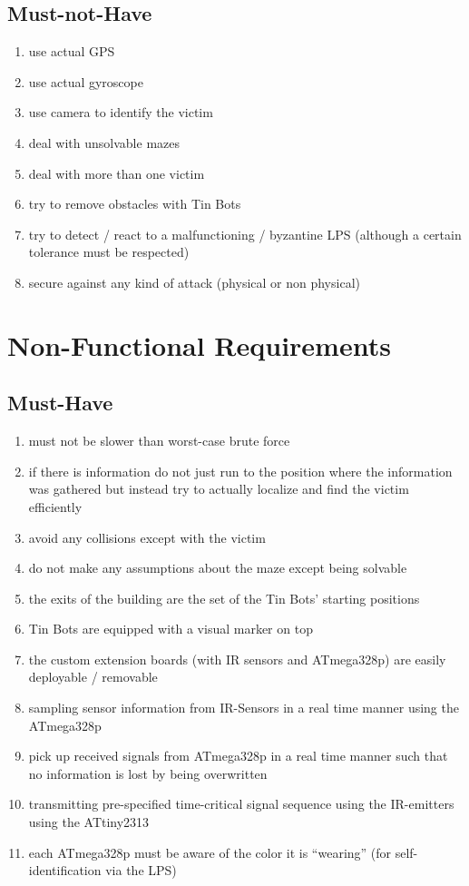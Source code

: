 \documentclass[a4paper,parskip,headheight=38pt]{scrartcl} %
\begin{document}
\subsection{Must-not-Have}
\begin{enumerate}[label=\mustnothave]
\item use actual GPS
\item use actual gyroscope
\item use camera to identify the victim
\item deal with unsolvable mazes
\item deal with more than one victim
\item try to remove obstacles with Tin Bots
\item try to detect / react to a malfunctioning / byzantine LPS (although a certain tolerance must be respected)
\item secure against any kind of attack (physical or non physical)
\end{enumerate}

\section{Non-Functional Requirements}
\subsection{Must-Have}
\begin{enumerate}[label=\musthave]
\item must not be slower than worst-case brute force
\item if there is information do not just run to the position where the information was gathered but instead try to actually localize and find the victim efficiently
\item avoid any collisions except with the victim
\item do not make any assumptions about the maze except being solvable
\item the exits of the building are the set of the Tin Bots' starting positions
\item Tin Bots are equipped with a visual marker on top
\item the custom extension boards (with IR sensors and ATmega328p) are easily deployable / removable
\item sampling sensor information from IR-Sensors in a real time manner using the ATmega328p 
\item pick up received signals from ATmega328p in a real time manner such that no information is lost by being overwritten
\item transmitting pre-specified time-critical signal sequence using the IR-emitters using the ATtiny2313
\item each ATmega328p must be aware of the color it is \enquote{wearing} (for self-identification via the LPS)
\end{enumerate}
\end{document}
